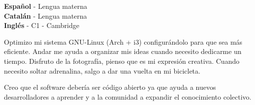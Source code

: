 \documentclass[9pt]{developercv} %
\begin{document}
\begin{minipage}[t]{0.3\textwidth}
	\vspace{-\baselineskip} %

	
	\textbf{Español} - Lengua materna\\
	\textbf{Catalán} - Lengua materna\\
	\textbf{Inglés} -  C1 - Cambridge
\end{minipage}
\hfill
\begin{minipage}[t]{0.3\textwidth}
	\vspace{-\baselineskip} %
	
	
  Optimizo mi sistema GNU-Linux (Arch + i3) configurándolo para que sea más eficiente.
  Andar me ayuda a organizar mis ideas cuando necesito dedicarme un tiempo.
  Disfruto de la fotografía, pienso que es mi expresión creativa.
  Cuando necesito soltar adrenalina, salgo a dar una vuelta en mi bicicleta.
\end{minipage}
\hfill
\begin{minipage}[t]{0.3\textwidth}
	\vspace{-\baselineskip} %
	

	Creo que el software debería ser código abierto ya que ayuda a nuevos desarrolladores a aprender y a la comunidad a expandir el conocimiento colectivo. 
\end{minipage}

\end{document}
